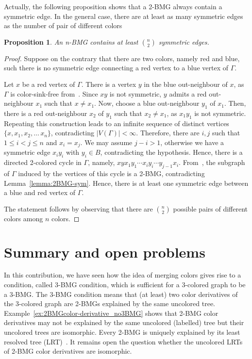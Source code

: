 \documentclass[final,3p,times]{elsarticle}
\newtheorem{proposition}[theorem]{Proposition}%
\begin{document}
Actually, the following proposition shows that a 2-BMG always contain a symmetric edge. In the general case, there are at least as many symmetric edges as the number of pair of different colors  
\begin{proposition}
An n-BMG contains at least $\binom{n}{2}$ symmetric edges.
\end{proposition}
\begin{proof}
Suppose on the contrary that there are two colors, namely red and blue, such there is no symmetric edge connecting a red vertex to a blue vertex of $\Gamma$.

Let $x$ be a red vertex of $\Gamma$. There is a vertex $y$ in the blue out-neighbour of $x$, as $\Gamma$ is color-sink-free from~\cite[Proposition~2.3]{korchmaros2021quasi}. Since $xy$ is not symmetric, $y$ admits a red out-neighbour $x_1$ such that $x\neq x_1$. Now, choose a blue out-neighbour $y_1$ of $x_1$. Then, there is a red out-neighbour $x_2$ of $y_1$ such that $x_2\neq x_1$, as $x_1y_1$ is not symmetric. Repeating this construction leads to an infinite sequence of distinct vertices $\{x,x_1,x_2,\ldots\,x_n\}$, contradicting $|V(\Gamma)|< \infty$. Therefore, there are $i,j$ such that $1\leq i<j\leq n$ and $x_i=x_j$. We may assume $j-i>1$, otherwise we have a symmetric edge $x_iy_i$ with $y_i\in B$, contradicting the hypothesis. Hence, there is a directed 2-colored cycle in $\Gamma$, namely, $xyx_1y_1\cdots x_iy_i\cdots y_{j-1}x_i$. From~\cite[Theorem~9]{schaller2021corrigendum}, the subgraph of $\Gamma$ induced by the vertices of this cycle is a 2-BMG, contradicting Lemma~\ref{lemma:2BMG-sym}. Hence, there is at least one symmetric edge between a blue and red vertex of $\Gamma$.

The statement follows by observing that there are $\binom{n}{2}$ possible pairs of different colors among $n$ colors. 
\end{proof}

\label{sec:cycles}
\section{Summary and open problems}
In this contribution, we have seen how the idea of merging colors gives rise to a condition, called 3-BMG condition, which is sufficient for a 3-colored graph to be a 3-BMG. The 3-BMG condition means that (at least) two color derivatives of the 3-colored graph are 2-BMGs explained by the same uncolored tree. Example~\ref{ex:2BMGcolor-derivative_no3BMG} shows that 2-BMG color derivatives may not be explained by the same uncolored (labelled) tree but their uncolored trees are isomorphic. Every 2-BMG is uniquely explained by its least resolved tree (LRT)~\cite[Theorem 8]{Geiss:19a}. It remains open the question whether the uncolored LRTs of 2-BMG color derivatives are isomorphic.
\end{document}
